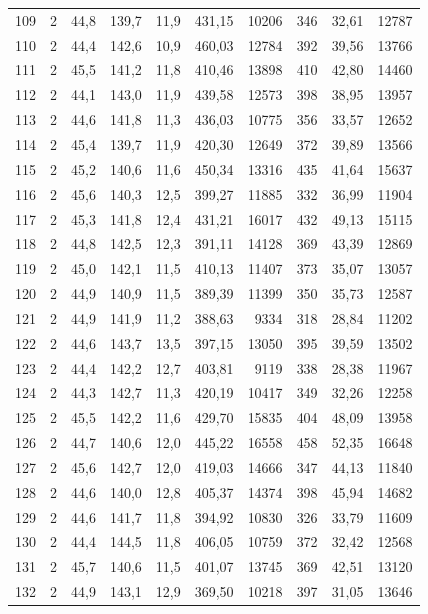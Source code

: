 \documentclass[11pt,a4paper]{article}
\begin{document}
{\begin{longtable}{r c r r r r r r r r}
109 & 2 & 44,8 & 139,7 & 11,9 & 431,15 & 10206 & 346 & 32,61 & 12787 \\
110 & 2 & 44,4 & 142,6 & 10,9 & 460,03 & 12784 & 392 & 39,56 & 13766 \\
111 & 2 & 45,5 & 141,2 & 11,8 & 410,46 & 13898 & 410 & 42,80 & 14460 \\
112 & 2 & 44,1 & 143,0 & 11,9 & 439,58 & 12573 & 398 & 38,95 & 13957 \\
113 & 2 & 44,6 & 141,8 & 11,3 & 436,03 & 10775 & 356 & 33,57 & 12652 \\
114 & 2 & 45,4 & 139,7 & 11,9 & 420,30 & 12649 & 372 & 39,89 & 13566 \\
115 & 2 & 45,2 & 140,6 & 11,6 & 450,34 & 13316 & 435 & 41,64 & 15637 \\
116 & 2 & 45,6 & 140,3 & 12,5 & 399,27 & 11885 & 332 & 36,99 & 11904 \\
117 & 2 & 45,3 & 141,8 & 12,4 & 431,21 & 16017 & 432 & 49,13 & 15115 \\
118 & 2 & 44,8 & 142,5 & 12,3 & 391,11 & 14128 & 369 & 43,39 & 12869 \\
119 & 2 & 45,0 & 142,1 & 11,5 & 410,13 & 11407 & 373 & 35,07 & 13057 \\
120 & 2 & 44,9 & 140,9 & 11,5 & 389,39 & 11399 & 350 & 35,73 & 12587 \\
121 & 2 & 44,9 & 141,9 & 11,2 & 388,63 & 9334 & 318 & 28,84 & 11202 \\
122 & 2 & 44,6 & 143,7 & 13,5 & 397,15 & 13050 & 395 & 39,59 & 13502 \\
123 & 2 & 44,4 & 142,2 & 12,7 & 403,81 & 9119 & 338 & 28,38 & 11967 \\
124 & 2 & 44,3 & 142,7 & 11,3 & 420,19 & 10417 & 349 & 32,26 & 12258 \\
125 & 2 & 45,5 & 142,2 & 11,6 & 429,70 & 15835 & 404 & 48,09 & 13958 \\
126 & 2 & 44,7 & 140,6 & 12,0 & 445,22 & 16558 & 458 & 52,35 & 16648 \\
127 & 2 & 45,6 & 142,7 & 12,0 & 419,03 & 14666 & 347 & 44,13 & 11840 \\
128 & 2 & 44,6 & 140,0 & 12,8 & 405,37 & 14374 & 398 & 45,94 & 14682 \\
129 & 2 & 44,6 & 141,7 & 11,8 & 394,92 & 10830 & 326 & 33,79 & 11609 \\
130 & 2 & 44,4 & 144,5 & 11,8 & 406,05 & 10759 & 372 & 32,42 & 12568 \\
131 & 2 & 45,7 & 140,6 & 11,5 & 401,07 & 13745 & 369 & 42,51 & 13120 \\
132 & 2 & 44,9 & 143,1 & 12,9 & 369,50 & 10218 & 397 & 31,05 & 13646 \\

\end{longtable}}
\end{document}
